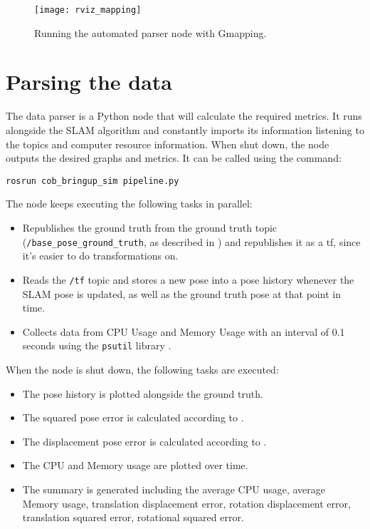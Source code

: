 \begin{figure}[!ht]
    \centering
    \texttt{[image: rviz\_mapping]}
    \caption{Running the automated parser node with Gmapping.}
    \label{fig:rviz_mapping}
\end{figure}

\section{Parsing the data}

The data parser is a Python node that will calculate the required metrics. It runs alongside the SLAM algorithm and constantly imports its information listening to the topics and computer resource information. When shut down, the node outputs the desired graphs and metrics. It can be called using the command:

\begin{verbatim}
rosrun cob_bringup_sim pipeline.py
\end{verbatim}

The node keeps executing the following tasks in parallel:

\begin{itemize}
    \item Republishes the ground truth from the ground truth topic (\texttt{/base\_pose\_ground\_truth}, as described in ) and republishes it as a tf, since it's easier to do transformations on. 
    \item Reads the \texttt{/tf} topic and stores a new pose into a pose history whenever the SLAM pose is updated, as well as the ground truth pose at that point in time.
    \item Collects data from CPU Usage and Memory Usage with an interval of 0.1 seconds using the \texttt{psutil} library \cite{psutil}.
\end{itemize}

When the node is shut down, the following tasks are executed:

\begin{itemize}
    \item The pose history is plotted alongside the ground truth.
    \item The squared pose error is calculated according to .
    \item The displacement pose error is calculated according to .
    \item The CPU and Memory usage are plotted over time.
    \item The summary is generated including the average CPU usage, average Memory usage, translation displacement error, rotation displacement error, translation squared error, rotational squared error.
\end{itemize}

